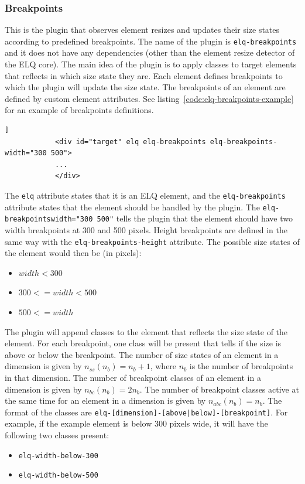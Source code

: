 \documentclass[a4paper,11pt]{kth-mag}
\newcommand{\code}[1]{\texttt{#1}}
\newcommand\abbr[2][]{\uppercase{#2}\ifthenelse{\equal{#1}{}}%
                     {}{#1}}
\begin{document}
        \subsubsection{Breakpoints}
          This is the plugin that observes element resizes and updates their size states according to predefined breakpoints.
          The name of the plugin is \code{elq-breakpoints} and it does not have any dependencies (other than the element resize detector of the \abbr{elq} core).
          The main idea of the plugin is to apply classes to target elements that reflects in which size state they are.
          Each element defines breakpoints to which the plugin will update the size state.
          The breakpoints of an element are defined by custom element attributes.
          See listing~\ref{code:elq-breakpoints-example} for an example of breakpoints definitions.
          \begin{lstlisting}[gobble=12,caption={Example an \gls{HTML} element that uses the \code{elq-breakpoints} plugin.},captionpos=b,label={code:elq-breakpoints-example}]]
            <div id="target" elq elq-breakpoints elq-breakpoints-width="300 500">
            ...
            </div>
          \end{lstlisting}
          The \code{elq} attribute states that it is an \abbr{elq} element, and the \code{elq-breakpoints} attribute states that the element should be handled by the plugin.
          The \code{elq-breakpoints\-width="300 500"} tells the plugin that the element should have two width breakpoints at 300 and 500 pixels.
          Height breakpoints are defined in the same way with the \code{elq-breakpoints-height} attribute.
          The possible size states of the element would then be (in pixels):
          \begin{itemize}
            \item $width < 300$
            \item $300 <= width < 500$
            \item $500 <= width$
          \end{itemize}
          The plugin will append classes to the element that reflects the size state of the element.
          For each breakpoint, one class will be present that tells if the size is above or below the breakpoint.
          The number of size states of an element in a dimension is given by $n_{ss}(n_b) = n_b + 1$, where $n_b$ is the number of breakpoints in that dimension.
          The number of breakpoint classes of an element in a dimension is given by $n_{bc}(n_{b}) = 2n_b$.
          The number of breakpoint classes active at the same time for an element in a dimension is given by $n_{abc}(n_{b}) = n_{b}$.
          The format of the classes are \code{elq-[dimension]-[above|below]-[breakpoint]}.
          For example, if the example element is below 300 pixels wide, it will have the following two classes present:
          \begin{itemize}
            \item \code{elq-width-below-300}
            \item \code{elq-width-below-500}
          \end{itemize}
\end{document}
